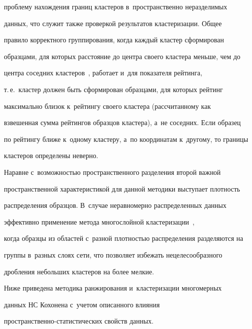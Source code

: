 проблему нахождения границ кластеров в~пространственно неразделимых 


данных, что служит также проверкой результатов кластеризации. Общее 


правило корректного группирования, когда каждый кластер сформирован 


образцами, для которых расстояние до центра своего кластера меньше, чем до 


центра соседних кластеров~\cite{1-anik}, работает и~для показателя рейтинга, 


т.\,е.\ кластер должен быть сформирован образцами, для которых рейтинг 


максимально близок к~рейтингу своего кластера (рассчитанному как 


взвешенная сумма рейтингов образцов кластера), а~не соседних. Если образец 


по рейтингу ближе к~одному кластеру, а~по координатам к~другому, то границы 


кластеров определены неверно. 


  


  Наравне с~возможностью пространственного разделения второй важной 


пространственной характеристикой для данной методики выступает плотность 


распределения образцов. В~случае неравномерно распределенных данных 


эффективно применение метода многослойной кластеризации~\cite{11-anik}, 


когда образцы из областей с~разной плотностью распределения разделяются на 


группы в~разных слоях сети, что позволяет избежать нецелесообразного 


дробления небольших кластеров на более мелкие.


  


  Ниже приведена методика ранжирования и~кластеризации многомерных 


данных НС Кохонена с~учетом описанного влияния 


пространственно-ста\-ти\-сти\-че\-ских свойств данных.


